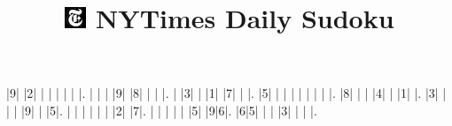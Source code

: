 \documentclass{article}
\title{\includegraphics{icons/nytimes-icon.png} NYTimes Daily Sudoku}
\author{}
\begin{document}
\maketitle

\begin{sudoku}
|9| |2| | | | | | |.
| | | |9| |8| | | |.
| |3| | |1| |7| | |.
|5| | | | | | | | |.
|8| | | |4| | |1| |.
|3| | | | |9| | |5|.
| | | | | | |2| |7|.
| | | | | |5| |9|6|.
|6|5| | | |3| | | |.
\end{sudoku}
\end{document}
